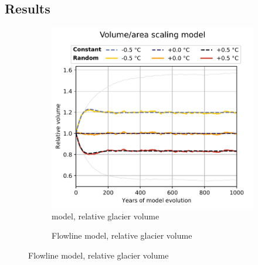 
    \subsection{Results} %
    \label{sub:results_regional_run}

        \begin{figure}[t!]
          \centering
          \begin{subfigure}[b]{0.48\textwidth}
            \caption{\Vas{} model, relative glacier volume}
            \label{fig:histalp_commitment:volume_norm_const}
            \centering
            \includegraphics[width=\textwidth]{../plots/final_plots/time_series/histalp_commitment/volume_norm_vas.pdf}
          \end{subfigure}
          \hfill
          \begin{subfigure}[b]{0.48\textwidth}
            \caption{Flowline model, relative glacier volume}
            \label{fig:histalp_commitment:volume_norm_random}
            \centering

\end{subfigure}
\end{figure}
